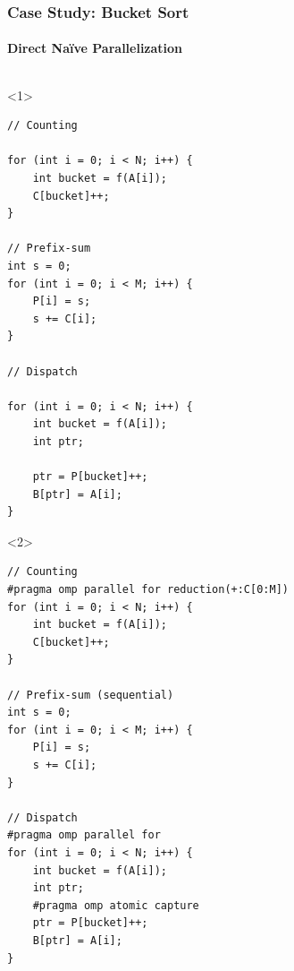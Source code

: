 \documentclass[xcolor={x11names,svgnames},x11names,svgnames]{beamer}
\begin{document}
\begin{frame}[fragile,label=radix_code]
  \frametitle{Case Study: Bucket Sort}
  \framesubtitle{Direct Naïve Parallelization}

    \begin{columns}[c]
    \begin{column}{.6\textwidth}

\begin{onlyenv}<1>
\begin{verbatim}
// Counting

for (int i = 0; i < N; i++) {
    int bucket = f(A[i]);
    C[bucket]++;
}

// Prefix-sum
int s = 0;
for (int i = 0; i < M; i++) {
    P[i] = s;
    s += C[i];
}

// Dispatch

for (int i = 0; i < N; i++) {
    int bucket = f(A[i]);
    int ptr;

    ptr = P[bucket]++;
    B[ptr] = A[i];
}
\end{verbatim}
\end{onlyenv}
%
\begin{onlyenv}<2>
\begin{verbatim}
// Counting
#pragma omp parallel for reduction(+:C[0:M])
for (int i = 0; i < N; i++) {
    int bucket = f(A[i]);
    C[bucket]++;
}

// Prefix-sum (sequential)
int s = 0;
for (int i = 0; i < M; i++) {
    P[i] = s;
    s += C[i];
}

// Dispatch
#pragma omp parallel for
for (int i = 0; i < N; i++) {
    int bucket = f(A[i]);
    int ptr;
    #pragma omp atomic capture
    ptr = P[bucket]++;
    B[ptr] = A[i];
}
\end{verbatim}
\end{onlyenv}

\end{column}

    \begin{column}{.4\textwidth}

\end{column}
\end{columns}
\end{frame}
\end{document}
